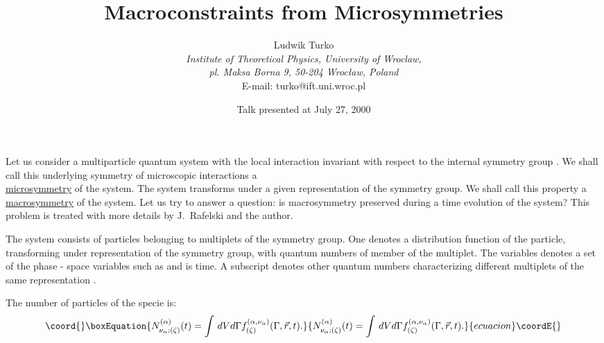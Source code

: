\documentclass[a4paper]{article}
\begin{document}
\title{Macroconstraints from Microsymmetries}%
\author{Ludwik
Turko\\ {\em Institute of Theoretical Physics, University of
Wroclaw,}\\ {\em pl. Maksa Borna 9, 50-204 Wroc\l aw, Poland}\\
{\small E-mail: turko@ift.uni.wroc.pl}}
\date{Talk presented at July 27, 2000}

Let us consider a multiparticle quantum system with the local
interaction invariant with respect to the internal symmetry group
\coordHE{}. We shall call this underlying symmetry of microscopic
interactions a\\ \underline{microsymmetry} of the system. The
system transforms under a given representation of the symmetry
group. We shall call this property a \underline{macrosymmetry} of
the system. Let us try to answer a question: is macrosymmetry
preserved during a time evolution of the system? This problem is
treated with more details by J.~Rafelski and the
author\cite{TurRaf}.

The system consists of particles belonging to multiplets of the
symmetry group. One denotes
\coordHE{} a distribution
function of the particle, transforming under \coordHE{}
representation of the symmetry group, with quantum numbers of
\coordHE{} member of the multiplet. The variables \coordHE{}
denotes a  set of the phase - space variables such as \coordHE{} and \coordHE{} is time. A subscript \myHighlight{$\zeta$}\coordHE{} denotes other
quantum numbers characterizing different multiplets of the same
representation \myHighlight{$\alpha$}\coordHE{}.

The number of particles of the specie \myHighlight{$\{\alpha,\nu_\alpha\}$}\coordHE{} is:
\begin{equation}\coord{}\boxEquation{
N^{(\alpha)}_{\nu_\alpha;(\zeta)}(t)=\int\,dV d\Gamma
f^{(\alpha,\nu_\alpha)}_{(\zeta)}(\Gamma,\vec r,t).
\label{numb}
}{
N^{(\alpha)}_{\nu_\alpha;(\zeta)}(t)=\int\,dV d\Gamma
f^{(\alpha,\nu_\alpha)}_{(\zeta)}(\Gamma,\vec r,t).
}{ecuacion}\coordE{}\end{equation}
\end{document}
